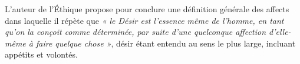 L’auteur de l’Éthique propose pour conclure une définition générale des affects
dans laquelle il répète que {\it « le Désir est l’essence même de l’homme, en tant
qu’on la conçoit comme déterminée, par suite d’une quelconque affection
d’elle-même à faire quelque chose »}, désir étant entendu au sens le plus large,
incluant appétits et volontés.


